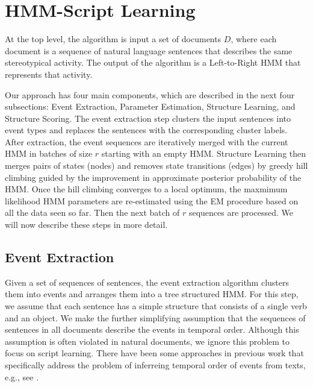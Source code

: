 \documentclass[letterpaper]{article}
\begin{document}
\section{HMM-Script Learning}

At the top level, the algorithm is input a set of documents $D$, where each document is a sequence of natural language sentences that describes the same stereotypical activity.
The output of the algorithm is a Left-to-Right HMM that represents that activity.









Our approach has four main components, which are described in the next four subsections: Event Extraction, Parameter Estimation, Structure Learning, and Structure Scoring. The event extraction step clusters the input sentences into event types and replaces the sentences with the corresponding cluster labels.  After extraction, the event sequences are iteratively merged with the current HMM in batches of size $r$ starting with an empty HMM. Structure Learning then merges pairs of states (nodes) and removes state transitions (edges) by greedy hill climbing guided by the improvement in approximate
posterior probability of the HMM.  Once the hill climbing converges to a local optimum, the maxmimum likelihood HMM parameters are re-estimated using the EM procedure based on all the data seen so far. Then the next batch of $r$ sequences are processed.  We will now describe these steps in more detail.

\subsection{Event Extraction}

Given a set of sequences of sentences, the event extraction algorithm clusters them into events and arranges them into a tree structured HMM. For this step, we assume that each sentence has a simple structure that consists of a single verb and an object. We make the further simplifying assumption that the sequences of sentences in all documents describe the events in temporal order. Although this assumption is often violated in natural documents, we ignore this problem to focus on script learning. There have been some approaches in previous work that specifically address the problem of inferreing temporal order of events from texts, e.g., see \cite{Raghavan:temporal}.
\end{document}
